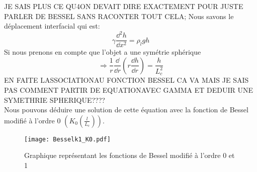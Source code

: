 
        JE SAIS PLUS CE QU4ON DEVAIT DIRE EXACTEMENT POUR JUSTE PARLER DE BESSEL SANS RACONTER TOUT CELA;
        Nous savons le déplacement interfacial\cite{introfluidcambridge} qui est:
        \begin{equation}
            \gamma \frac{\dd^2h}{\dd x^2} = \rho_l g h
        \end{equation}
        Si nous prenons en compte que l'objet a une symétrie sphérique
        \begin{equation}
            \Rightarrow \frac{1}{r} \frac{\dd}{\dd r} \left( r\frac{\dd h}{\dd r}\right) = \frac{h}{L_c^2}
        \end{equation}
        EN FAITE LASSOCIATIONAU FONCTION BESSEL CA VA MAIS JE SAIS PAS COMMENT PARTIR DE EQUATIONAVEC GAMMA ET DEDUIR UNE SYMETHRIE SPHERIQUE????\\
        Nous pouvons déduire une solution de cette équation avec la fonction de Bessel modifié à l'ordre 0 \cite{introbessel} $(K_0\left(\frac{l}{L_c}\right))$.

        \begin{figure}[H]
            \centering
            \texttt{[image: Besselk1\_K0.pdf]}
            \caption{Graphique représentant les fonctions de Bessel modifié à l'ordre 0 et 1}
            \label{fig:bessel}
        \end{figure}

